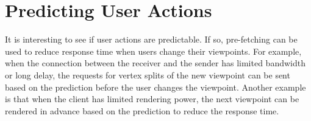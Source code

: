 
\section{Predicting User Actions}
\label{ss:user:predictability}
It is interesting to see if user actions are predictable. 
If so, pre-fetching can be used to reduce response time when
users change their viewpoints. For example, when the connection between the 
receiver and the sender has limited bandwidth
or long delay, the requests for vertex splits of the new viewpoint 
can be sent based on the prediction before the user changes the viewpoint.
Another example is that when the client has limited
rendering power, the next viewpoint can be rendered
in advance based on the prediction to reduce the response time. 

